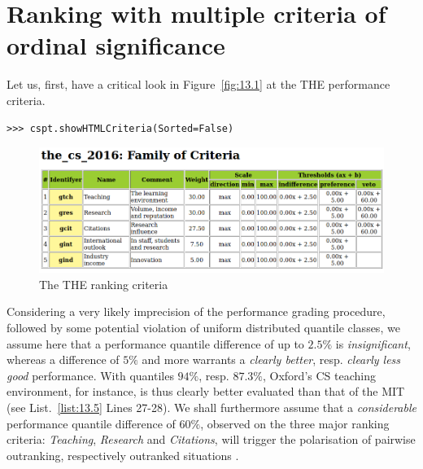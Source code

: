 \section{Ranking with multiple criteria of ordinal significance}
\label{sec:13.2}

Let us, first, have a critical look in Figure~\vref{fig:13.1} at the THE performance criteria.
\begin{lstlisting}
>>> cspt.showHTMLCriteria(Sorted=False)
\end{lstlisting}
\begin{figure}[ht]
\includegraphics[width=\hsize]{Figures/13-1-the_cs_2016Criteria.png}
\caption{The THE ranking criteria}
\label{fig:13.1}       %
\end{figure}

Considering a very likely imprecision of the performance grading procedure, followed by some potential violation of uniform distributed quantile classes, we assume here that a performance quantile difference of up to $2.5\%$ is \emph{insignificant}, whereas a difference of $5\%$ and more warrants a \emph{clearly better}, resp. \emph{clearly less good} performance. With quantiles $94\%$, resp. $87.3\%$, Oxford's CS teaching environment, for instance, is thus clearly better evaluated than that of the MIT (see List.~\vref{list:13.5} Lines 27-28). We shall furthermore assume that a \emph{considerable} performance quantile difference of $60\%$, observed on the three major ranking criteria: \emph{Teaching}, \emph{Research} and \emph{Citations}, will trigger the polarisation of pairwise outranking, respectively outranked situations \citep{BIS-2013}.

